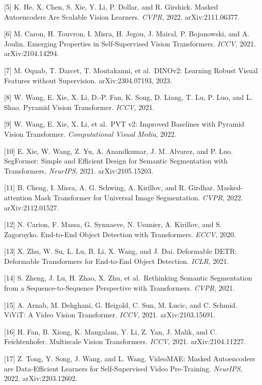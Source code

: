 {[}5{]} K. He, X. Chen, S. Xie, Y. Li, P. Dollar, and R. Girshick. Masked Autoencoders Are Scalable Vision Learners. \emph{CVPR}, 2022. arXiv:2111.06377.

{[}6{]} M. Caron, H. Touvron, I. Misra, H. Jegou, J. Mairal, P. Bojanowski, and A. Joulin. Emerging Properties in Self-Supervised Vision Transformers. \emph{ICCV}, 2021. arXiv:2104.14294.

{[}7{]} M. Oquab, T. Darcet, T. Moutakanni, et al.~DINOv2: Learning Robust Visual Features without Supervision. arXiv:2304.07193, 2023.

{[}8{]} W. Wang, E. Xie, X. Li, D.-P. Fan, K. Song, D. Liang, T. Lu, P. Luo, and L. Shao. Pyramid Vision Transformer. \emph{ICCV}, 2021.

{[}9{]} W. Wang, E. Xie, X. Li, et al.~PVT v2: Improved Baselines with Pyramid Vision Transformer. \emph{Computational Visual Media}, 2022.

{[}10{]} E. Xie, W. Wang, Z. Yu, A. Anandkumar, J. M. Alvarez, and P. Luo. SegFormer: Simple and Efficient Design for Semantic Segmentation with Transformers. \emph{NeurIPS}, 2021. arXiv:2105.15203.

{[}11{]} B. Cheng, I. Misra, A. G. Schwing, A. Kirillov, and R. Girdhar. Masked-attention Mask Transformer for Universal Image Segmentation. \emph{CVPR}, 2022. arXiv:2112.01527.

{[}12{]} N. Carion, F. Massa, G. Synnaeve, N. Usunier, A. Kirillov, and S. Zagoruyko. End-to-End Object Detection with Transformers. \emph{ECCV}, 2020.

{[}13{]} X. Zhu, W. Su, L. Lu, B. Li, X. Wang, and J. Dai. Deformable DETR: Deformable Transformers for End-to-End Object Detection. \emph{ICLR}, 2021.

{[}14{]} S. Zheng, J. Lu, H. Zhao, X. Zhu, et al.~Rethinking Semantic Segmentation from a Sequence-to-Sequence Perspective with Transformers. \emph{CVPR}, 2021.

{[}15{]} A. Arnab, M. Dehghani, G. Heigold, C. Sun, M. Lucic, and C. Schmid. ViViT: A Video Vision Transformer. \emph{ICCV}, 2021. arXiv:2103.15691.

{[}16{]} H. Fan, B. Xiong, K. Mangalam, Y. Li, Z. Yan, J. Malik, and C. Feichtenhofer. Multiscale Vision Transformers. \emph{ICCV}, 2021. arXiv:2104.11227.

{[}17{]} Z. Tong, Y. Song, J. Wang, and L. Wang. VideoMAE: Masked Autoencoders are Data-Efficient Learners for Self-Supervised Video Pre-Training. \emph{NeurIPS}, 2022. arXiv:2203.12602.

